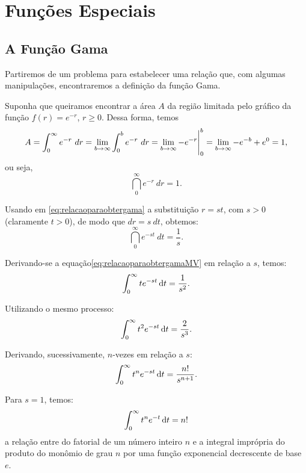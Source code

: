 
\chapter{Funções Especiais}


\section{A Função Gama}

Partiremos de um problema para estabelecer uma relação que, com algumas manipulações, encontraremos a definição da função Gama.

Suponha que queiramos encontrar a área \(A\) da região limitada pelo gráfico da função \(f(r) = e^{-r}\), \(r \ge 0\). Dessa forma, temos
\begin{equation*}
A
= \displaystyle \int_{0}^{\infty} e^{-r} \ dr
= \displaystyle \lim_{b \to \infty} \displaystyle \int_{0}^{b} e^{-r}\ dr
= \displaystyle \lim_{b \to \infty} -e^{-r} \Bigg|_{0}^{b}
= \displaystyle \lim_{b \to \infty} -e^{-b} + e^{0}
= 1,
\end{equation*}
ou seja,
\begin{equation}\label{eq:relacaoparaobtergama}
\dint_{0}^{\infty} e^{-r} \ dr = 1.
\end{equation}

Usando em \eqref{eq:relacaoparaobtergama} a substituição $r = st$, com $s>0$ (claramente $t>0$), de modo que $dr = s \ dt$, obtemos:
\begin{equation}\label{eq:relacaoparaobtergamaMV}
\dint_{0}^{\infty} e^{-st} \ dt = \dfrac{1}{s}.
\end{equation}

Derivando-se a equação\eqref{eq:relacaoparaobtergamaMV} em relação a $s$, temos:
\begin{equation}
\displaystyle \int_{0}^{\infty} t e^{-st}\operatorname{d}\!t = \displaystyle \frac{1}{s^2}.
\end{equation}

Utilizando o mesmo processo:
\begin{equation}
\displaystyle \int_{0}^{\infty} t^{2} e^{-st} \operatorname{d}\!t = \displaystyle \frac{2}{s^{3}}.
\end{equation}

Derivando, sucessivamente, $n$-vezes em relação a $s$:
\begin{equation}
\displaystyle \int_{0}^{\infty} t^{n} e^{-st}\operatorname{d}\!t = \displaystyle \frac{n!}{s^{n+1}}.
\end{equation}

Para $s=1$, temos:
\begin{equation}
\displaystyle \int_{0}^{\infty} t^{n} e^{-t}\operatorname{d}\!t = n!
\end{equation}
a relação entre do fatorial de um número inteiro \(n\) e a integral imprópria do produto do monômio de grau $n$ por uma função exponencial decrescente de base $e$.

